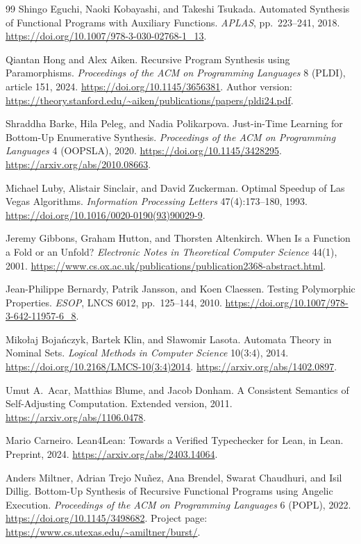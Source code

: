 \begin{thebibliography}{99}
 Shingo Eguchi, Naoki Kobayashi, and Takeshi Tsukada.
Automated Synthesis of Functional Programs with Auxiliary Functions.
\emph{APLAS}, pp.~223--241, 2018.
\url{https://doi.org/10.1007/978-3-030-02768-1_13}.

 Qiantan Hong and Alex Aiken.
Recursive Program Synthesis using Paramorphisms.
\emph{Proceedings of the ACM on Programming Languages} 8 (PLDI), article 151, 2024.
\url{https://doi.org/10.1145/3656381}.
Author version: \url{https://theory.stanford.edu/~aiken/publications/papers/pldi24.pdf}.

 Shraddha Barke, Hila Peleg, and Nadia Polikarpova.
Just-in-Time Learning for Bottom-Up Enumerative Synthesis.
\emph{Proceedings of the ACM on Programming Languages} 4 (OOPSLA), 2020.
\url{https://doi.org/10.1145/3428295}.
\url{https://arxiv.org/abs/2010.08663}.

 Michael Luby, Alistair Sinclair, and David Zuckerman.
Optimal Speedup of Las Vegas Algorithms.
\emph{Information Processing Letters} 47(4):173--180, 1993.
\url{https://doi.org/10.1016/0020-0190(93)90029-9}.

 Jeremy Gibbons, Graham Hutton, and Thorsten Altenkirch.
When Is a Function a Fold or an Unfold?
\emph{Electronic Notes in Theoretical Computer Science} 44(1), 2001.
\url{https://www.cs.ox.ac.uk/publications/publication2368-abstract.html}.

 Jean-Philippe Bernardy, Patrik Jansson, and Koen Claessen.
Testing Polymorphic Properties. \emph{ESOP}, LNCS 6012, pp.~125--144, 2010.
\url{https://doi.org/10.1007/978-3-642-11957-6_8}.

 Miko{\l}aj Boja{\'n}czyk, Bartek Klin, and S{\l}awomir Lasota.
Automata Theory in Nominal Sets.
\emph{Logical Methods in Computer Science} 10(3:4), 2014.
\url{https://doi.org/10.2168/LMCS-10(3:4)2014}.
\url{https://arxiv.org/abs/1402.0897}.

 Umut A.~Acar, Matthias Blume, and Jacob Donham.
A Consistent Semantics of Self-Adjusting Computation.
Extended version, 2011.
\url{https://arxiv.org/abs/1106.0478}.

 Mario Carneiro.
Lean4Lean: Towards a Verified Typechecker for Lean, in Lean.
Preprint, 2024.
\url{https://arxiv.org/abs/2403.14064}.

 Anders Miltner, Adrian Trejo Nu{\~n}ez, Ana Brendel,
Swarat Chaudhuri, and Isil Dillig.
Bottom-Up Synthesis of Recursive Functional Programs using Angelic Execution.
\emph{Proceedings of the ACM on Programming Languages} 6 (POPL), 2022.
\url{https://doi.org/10.1145/3498682}.
Project page: \url{https://www.cs.utexas.edu/~amiltner/burst/}.


\end{thebibliography}
